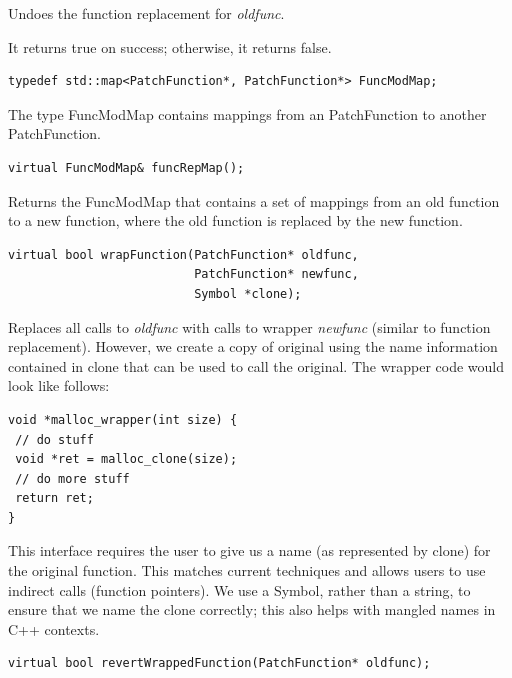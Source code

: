 \documentclass[11pt]{article}
\begin{document}
Undoes the function replacement for \emph{oldfunc}.

It returns true on success; otherwise, it returns false.


\begin{verbatim}
typedef std::map<PatchFunction*, PatchFunction*> FuncModMap;

\end{verbatim}



The type FuncModMap contains mappings from an PatchFunction to another
PatchFunction.


\begin{verbatim}
virtual FuncModMap& funcRepMap();

\end{verbatim}



Returns the FuncModMap that contains a set of mappings from an old function to a
new function, where the old function is replaced by the new function.


\begin{verbatim}
virtual bool wrapFunction(PatchFunction* oldfunc,
                          PatchFunction* newfunc,
                          Symbol *clone);

\end{verbatim}



Replaces all calls to \emph{oldfunc} with calls to wrapper \emph{newfunc} (similar to
function replacement). However, we create a copy of original using the name
information contained in clone that can be used to call the original. The
wrapper code would look like follows:


\begin{verbatim}
void *malloc_wrapper(int size) {
 // do stuff
 void *ret = malloc_clone(size);
 // do more stuff
 return ret;
}

\end{verbatim}



This interface requires the user to give us a name (as represented by clone) for
the original function. This matches current techniques and allows users to use
indirect calls (function pointers). We use a Symbol, rather than a string, to
ensure that we name the clone correctly; this also helps with mangled names in
C++ contexts.


\begin{verbatim}
virtual bool revertWrappedFunction(PatchFunction* oldfunc);

\end{verbatim}
\end{document}
